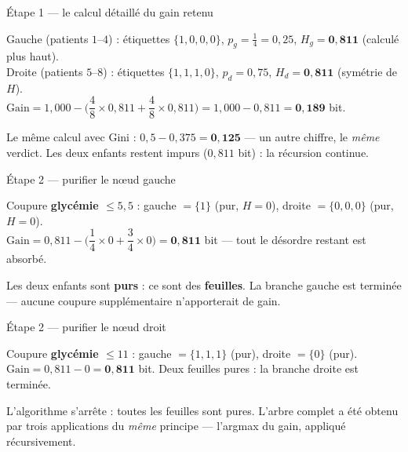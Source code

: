\documentclass[aspectratio=169,11pt]{beamer}
\begin{document}
\begin{frame}{Étape 1 — le calcul détaillé du gain retenu}
\begin{ucadex}
{\small Gauche (patients $1$–$4$) : étiquettes $\{1,0,0,0\}$, $p_g = \tfrac{1}{4} = 0{,}25$, $H_g = \mathbf{0{,}811}$ (calculé plus haut).\\
Droite (patients $5$–$8$) : étiquettes $\{1,1,1,0\}$, $p_d = 0{,}75$, $H_d = \mathbf{0{,}811}$ (symétrie de $H$).\\[4pt]
$\text{Gain} = 1{,}000 - \Big(\dfrac{4}{8}\times 0{,}811 + \dfrac{4}{8}\times 0{,}811\Big) = 1{,}000 - 0{,}811 = \mathbf{0{,}189}$ bit.}
\end{ucadex}
{\small Le même calcul avec Gini : $0{,}5 - 0{,}375 = \mathbf{0{,}125}$ — un autre chiffre, le \emph{même} verdict. Les deux enfants restent impurs ($0{,}811$ bit) : la récursion continue.}
\end{frame}

\begin{frame}{Étape 2 — purifier le nœud gauche}
\begin{ucadex}
{\small Coupure \textbf{glycémie $\le 5{,}5$} : gauche $=\{1\}$ (pur, $H=0$), droite $=\{0,0,0\}$ (pur, $H=0$).\\[4pt]
$\text{Gain} = 0{,}811 - \Big(\dfrac{1}{4}\times 0 + \dfrac{3}{4}\times 0\Big) = \mathbf{0{,}811}$ bit — tout le désordre restant est absorbé.}
\end{ucadex}
{\small Les deux enfants sont \textbf{purs} : ce sont des \textbf{feuilles}. La branche gauche est terminée — aucune coupure supplémentaire n'apporterait de gain.}
\end{frame}

\begin{frame}{Étape 2 — purifier le nœud droit}
\begin{ucadex}
{\small Coupure \textbf{glycémie $\le 11$} : gauche $=\{1,1,1\}$ (pur), droite $=\{0\}$ (pur).\\[4pt]
$\text{Gain} = 0{,}811 - 0 = \mathbf{0{,}811}$ bit. Deux feuilles pures : la branche droite est terminée.}
\end{ucadex}
{\small L'algorithme s'arrête : toutes les feuilles sont pures. L'arbre complet a été obtenu par trois applications du \emph{même} principe — l'argmax du gain, appliqué récursivement.}
\end{frame}
\end{document}
